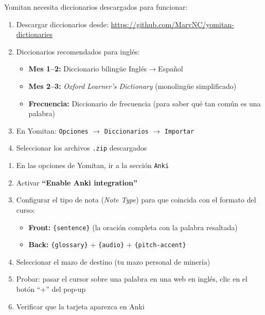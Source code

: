 \documentclass[12pt,a4paper]{article}
\begin{document}
\begin{cajapaso}
Yomitan necesita diccionarios descargados para funcionar:

\begin{enumerate}[leftmargin=1.2cm]
  \item Descargar diccionarios desde: \url{https://github.com/MarvNC/yomitan-dictionaries}
  \item Diccionarios recomendados para inglés:
    \begin{itemize}[nosep]
      \item \textbf{Mes 1--2:} Diccionario bilingüe Inglés$\rightarrow$Español
      \item \textbf{Mes 2--3:} \textit{Oxford Learner's Dictionary} (monolingüe simplificado)
      \item \textbf{Frecuencia:} Diccionario de frecuencia (para saber qué tan común es una palabra)
    \end{itemize}
  \item En Yomitan: \texttt{Opciones} $\rightarrow$ \texttt{Diccionarios} $\rightarrow$ \texttt{Importar}
  \item Seleccionar los archivos \texttt{.zip} descargados
\end{enumerate}
\end{cajapaso}

\begin{cajapaso}
\begin{enumerate}[leftmargin=1.2cm]
  \item En las opciones de Yomitan, ir a la sección \texttt{Anki}
  \item Activar \textbf{``Enable Anki integration''}
  \item Configurar el tipo de nota (\textit{Note Type}) para que coincida con el formato del curso:
    \begin{itemize}[nosep]
      \item \textbf{Front:} \texttt{\{sentence\}} (la oración completa con la palabra resaltada)
      \item \textbf{Back:} \texttt{\{glossary\}} + \texttt{\{audio\}} + \texttt{\{pitch-accent\}}
    \end{itemize}
  \item Seleccionar el mazo de destino (tu mazo personal de minería)
  \item Probar: pasar el cursor sobre una palabra en una web en inglés, clic en el botón ``+'' del pop-up
  \item Verificar que la tarjeta aparezca en Anki
\end{enumerate}
\end{cajapaso}
\end{document}
